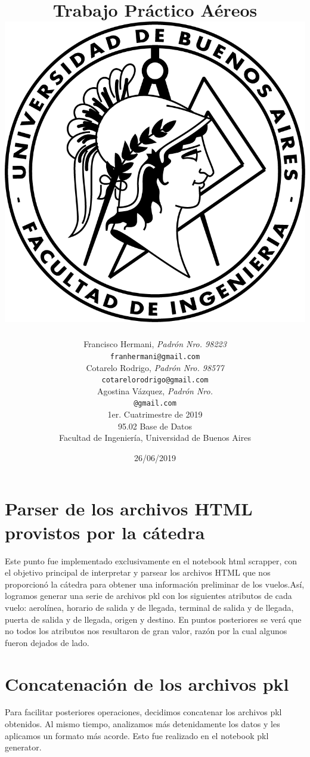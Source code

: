 \documentclass[a4paper,11pt]{article}
\title{\textbf{Trabajo Práctico Aéreos} \\[1cm] \includegraphics[scale=1]{./imagenes/fiuba.png}}
\author{	Francisco Hermani, \textit{Padrón Nro. 98223}                     \\
            \texttt{ franhermani@gmail.com }                                              \\[2.5ex]
            Cotarelo Rodrigo, \textit{Padrón Nro. 98577}                     \\
            \texttt{ cotarelorodrigo@gmail.com }                                              \\[2.5ex]
			Agostina Vázquez, \textit{Padrón Nro. }                    
\\
            \texttt{ @gmail.com }                                              \\[2.5ex]
            \normalsize{1er. Cuatrimestre de 2019}                                      \\
            \normalsize{95.02 Base de Datos}  \\
            \normalsize{Facultad de Ingeniería, Universidad de Buenos Aires}            \\
       }
\date{26/06/2019}
\begin{document}
\maketitle
\thispagestyle{empty}   %
\newpage

\section{Parser de los archivos HTML provistos por la cátedra}
Este punto fue implementado exclusivamente en el notebook html scrapper, con el objetivo principal de interpretar y parsear los archivos HTML que nos proporcionó la cátedra para obtener una información preliminar de los vuelos.Así, logramos generar una serie de archivos pkl con los siguientes atributos de cada vuelo: aerolínea, horario de salida y de llegada, terminal de salida y de llegada, puerta de salida y de llegada, origen y destino. En puntos posteriores se verá que no todos los atributos nos resultaron de gran valor, razón por la cual algunos fueron dejados de lado.

\section{Concatenación de los archivos pkl}
Para facilitar posteriores operaciones, decidimos concatenar los archivos pkl obtenidos. Al mismo tiempo, analizamos más detenidamente los datos y les aplicamos un formato más acorde.
Esto fue realizado en el notebook pkl generator.
\end{document}
